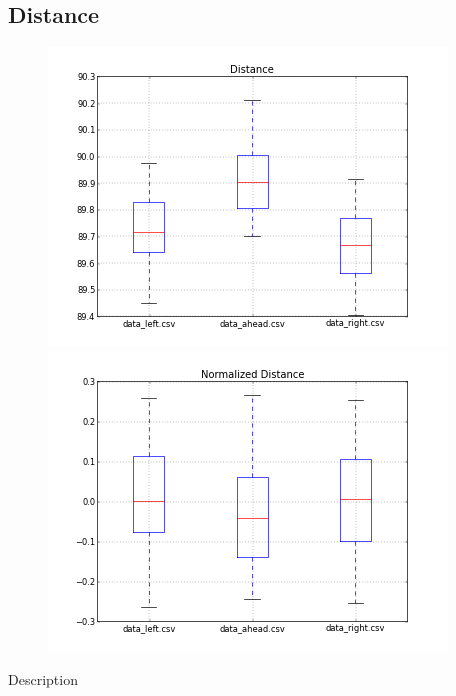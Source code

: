 \documentclass{scrartcl}
\begin{document}
\subsection{Distance}
\begin{figure}[H]
\centering
\begin{minipage}{.5\textwidth}
  \centering
  \includegraphics[width=1.0\linewidth]{img/BoxplotDistance.png}
\end{minipage}%
\begin{minipage}{.5\textwidth}
  \centering
  \includegraphics[width=1.0\linewidth]{img/BoxplotDistanceNorm.png}
\end{minipage}
\end{figure}
Description
\end{document}
